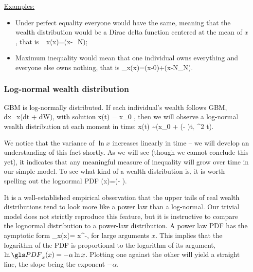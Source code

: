 \underline{Examples:}
\begin{itemize}
\item Under perfect equality everyone would have the same, meaning that the wealth
distribution would be a Dirac delta function centered at the mean of $x$, that is
\be
\PDF_x(x)=\delta(x-_N);
\ee
\item
Maximum inequality would mean that one individual owns everything
and everyone else owns nothing, that is
\be 
\PDF_x(x)=\delta(x-0)+\delta(x-N_N).
\ee
\end{itemize}

\subsubsection{Log-normal wealth distribution}
GBM is log-normally distributed. If each individual's wealth follows GBM,
\be
dx=x(\mu dt + \sigma dW),
\ee
with solution 
\be
x(t) = x_0 \exp{},
\ee
then we will observe a log-normal wealth distribution at each moment in time:
\be
\ln x(t) \sim {}\left(\ln x_0 + \left(\mu - \right)t, \sigma^2 t\right).
\ee


We notice that the variance of $\ln x$ increases linearly in time -- 
we will develop an understanding of this fact shortly. As we will see 
(though we cannot conclude this yet), it indicates that any meaningful 
measure of inequality will grow over time in our simple model. 
To see what kind of a wealth distribution  is, it is worth 
spelling out the lognormal PDF
\be
\PDF(x)=\exp\left(- \right).
\ee

It is a well-established empirical observation \cite{Newman2005} that the upper tails of 
real wealth distributions tend to look more like a power law than a log-normal. Our trivial model does not
strictly reproduce this feature, but it is instructive to compare the lognormal distribution
to a power-law distribution. A power law PDF has the aymptotic form 
\be
\PDF_x(x)= x^{-\alpha},
\ee
for large arguments $x$. This implies that the logarithm of the PDF is proportional 
to the logarithm of its argument, $\ln \PDF_x(x) = -\alpha \ln x$. Plotting
one against the other will yield a straight line, the slope being the exponent $-\alpha$. 

